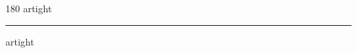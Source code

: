 
\begin{frame}
\begin{center}
\begin{turn}{180}
{\fontsize{2.5cm}{1em}\selectfont artight}
\end{turn}
\vspace{1em}\par  
\hrule
\vspace{1em}\par  
{\fontsize{2.5cm}{1em}\selectfont artight}
\end{center}
\end{frame}
